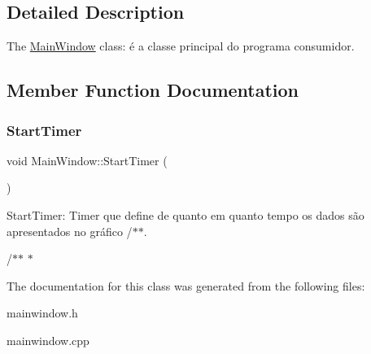 \subsection{Detailed Description}
The \hyperlink{class_main_window}{Main\+Window} class\+: é a classe principal do programa consumidor. 

\subsection{Member Function Documentation}
\mbox{\label{class_main_window_a6ab0b8fe470b5a5d992fd4a2c3bcf884}} 
\subsubsection{\texorpdfstring{Start\+Timer}{StartTimer}}
{\footnotesize\ttfamily void Main\+Window\+::\+Start\+Timer (\begin{DoxyParamCaption}{ }\end{DoxyParamCaption})\hspace{0.3cm}{\ttfamily [slot]}}



Start\+Timer\+: Timer que define de quanto em quanto tempo os dados são apresentados no gráfico /$\ast$$\ast$. 

/$\ast$$\ast$ $\ast$ 

The documentation for this class was generated from the following files\+:\begin{DoxyCompactItemize}
\item 
mainwindow.\+h\item 
mainwindow.\+cpp\end{DoxyCompactItemize}
